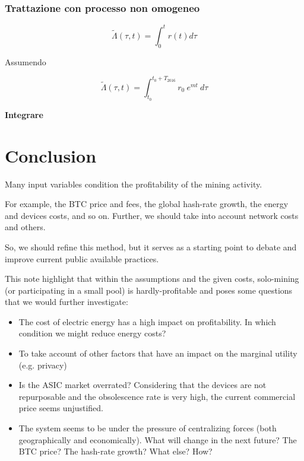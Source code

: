 \documentclass{book}
\theoremstyle{definition}
\begin{document}
\subsubsection{Trattazione con processo non omogeneo}

\begin{equation}
    \tilde{\Lambda}(\tau, t) = \int_{0}^{t} r(t) d\tau
\end{equation}

Assumendo

\begin{equation}
    \tilde{\Lambda}(\tau, t) = \int_{t_{0}}^{t_{0} + T_{2016}} r_{0} \ e^{m t} \ d\tau
\end{equation}

\textbf{Integrare}

\newpage

\section{Conclusion}

Many input variables condition the profitability of the mining activity.

For example, the BTC price and fees, the global hash-rate growth, the energy and devices costs, and so on. Further, we should take into account network costs and others.

So, we should refine this method, but it serves as a starting point to debate and improve current public available practices.

This note highlight that within the assumptions and the given costs, solo-mining (or participating in a small pool) is hardly-profitable and poses some questions that we would further investigate:


\begin{itemize}
    \item The cost of electric energy has a high impact on profitability. In which condition we might reduce energy costs?
    \item To take account of other factors that have an impact on the marginal utility (e.g. privacy)
    \item Is the ASIC market overrated? Considering that the devices are not repurposable and the obsolescence rate is very high, the current commercial price seems unjustified.
    \item The system seems to be under the pressure of centralizing forces (both geographically and economically). What will change in the next future? The BTC price? The hash-rate growth? What else? How?
\end{itemize}
\end{document}
